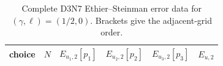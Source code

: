 \begin{table}[htbp]

\centering
\caption{Complete D3N7 Ethier--Steinman error data for $(\gamma,\ell)=(1/2,0)$.  Brackets give the adjacent-grid order.}
\label{tab:numerical-ethier-errors-full}
\begingroup
\scriptsize
\setlength{\tabcolsep}{2.8pt}
\begin{tabular}{@{}lrrrrr@{}}
\toprule
choice & $N$ & $E_{u_1,2}[p_1]$ & $E_{u_2,2}[p_2]$ & $E_{u_3,2}[p_3]$ & $E_{u,2}$\\
\midrule
\bottomrule
\end{tabular}
\endgroup
\end{table}

